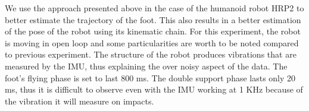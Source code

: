 We use the approach presented above in the case of the humanoid robot HRP2 to better estimate the trajectory of the foot. This also results in a better estimation of the pose of the robot using its kinematic chain. 
For this experiment, the robot is moving in open loop and some particularities are worth to be noted compared to previous experiment. 
The structure of the robot produces vibrations that are measured by the IMU, thus explaining the over noisy aspect of the data. The foot's flying phase is set to last 800 ms. The double support phase lasts only 20 ms, thus it is difficult to observe
even with the IMU working at 1 KHz because of the vibration it will measure on impacts.







